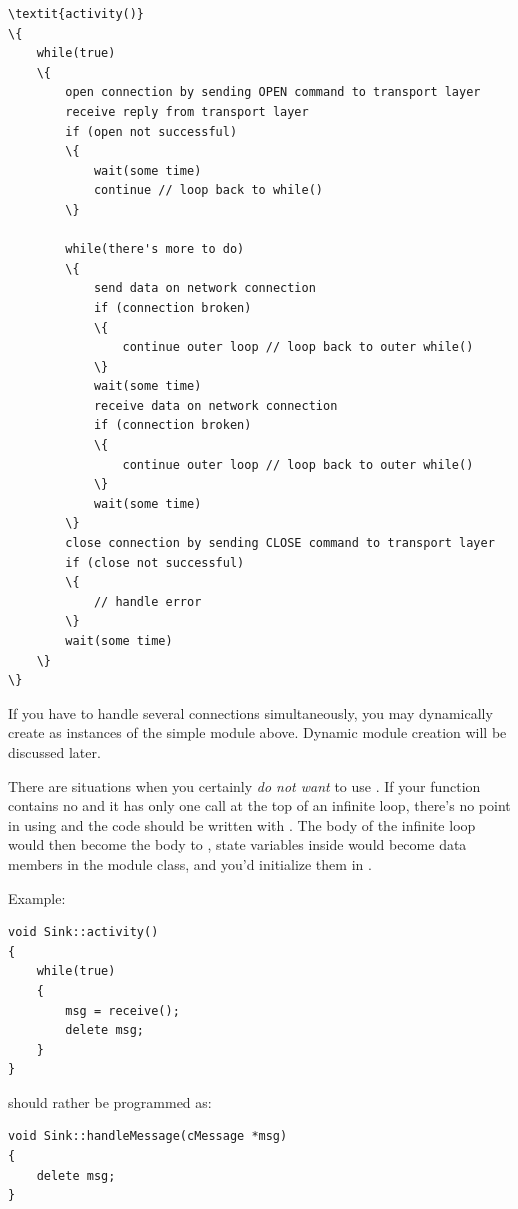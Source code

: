 \begin{Verbatim}[commandchars=\\\{\}]
\textit{activity()}
\{
    while(true)
    \{
        open connection by sending OPEN command to transport layer
        receive reply from transport layer
        if (open not successful)
        \{
            wait(some time)
            continue // loop back to while()
        \}

        while(there's more to do)
        \{
            send data on network connection
            if (connection broken)
            \{
                continue outer loop // loop back to outer while()
            \}
            wait(some time)
            receive data on network connection
            if (connection broken)
            \{
                continue outer loop // loop back to outer while()
            \}
            wait(some time)
        \}
        close connection by sending CLOSE command to transport layer
        if (close not successful)
        \{
            // handle error
        \}
        wait(some time)
    \}
\}
\end{Verbatim}

If you have to handle several connections simultaneously, you may
dynamically create as instances of the simple module above.
Dynamic module creation will be discussed later.

There are situations when you certainly \textit{do not want} to use .
If your  function contains no  and it has
only one  call at the top of an infinite loop,
there's no point in using  and the code should be written
with .
The body of the infinite loop would then become the body to ,
state variables inside  would become data members in
the module class, and you'd initialize them in .

Example:

\begin{verbatim}
void Sink::activity()
{
    while(true)
    {
        msg = receive();
        delete msg;
    }
}
\end{verbatim}

should rather be programmed as:

\begin{verbatim}
void Sink::handleMessage(cMessage *msg)
{
    delete msg;
}
\end{verbatim}



